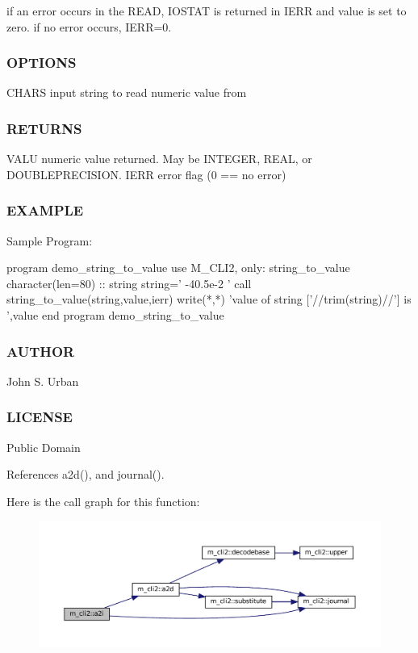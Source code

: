 if an error occurs in the R\+E\+AD, I\+O\+S\+T\+AT is returned in I\+E\+RR and value is set to zero. if no error occurs, I\+E\+RR=0. \subsubsection*{O\+P\+T\+I\+O\+NS}

C\+H\+A\+RS input string to read numeric value from \subsubsection*{R\+E\+T\+U\+R\+NS}

V\+A\+LU numeric value returned. May be I\+N\+T\+E\+G\+ER, R\+E\+AL, or D\+O\+U\+B\+L\+E\+P\+R\+E\+C\+I\+S\+I\+ON. I\+E\+RR error flag (0 == no error) \subsubsection*{E\+X\+A\+M\+P\+LE}

Sample Program\+: \begin{DoxyVerb} program demo_string_to_value
 use M_CLI2, only: string_to_value
 character(len=80) :: string
    string=' -40.5e-2 '
    call string_to_value(string,value,ierr)
    write(*,*) 'value of string ['//trim(string)//'] is ',value
 end program demo_string_to_value
\end{DoxyVerb}
 \subsubsection*{A\+U\+T\+H\+OR}

John S. Urban \subsubsection*{L\+I\+C\+E\+N\+SE}

Public Domain 

References a2d(), and journal().

Here is the call graph for this function\+:\nopagebreak
\begin{figure}[H]
\begin{center}
\leavevmode
\includegraphics[width=350pt]{namespacem__cli2_a0be58233adafc0bf10dfe69300a05b9f_cgraph}
\end{center}
\end{figure}
\mbox{\label{namespacem__cli2_a02d4639b325d1b8c6fd3b03ba515f2b3}} 
